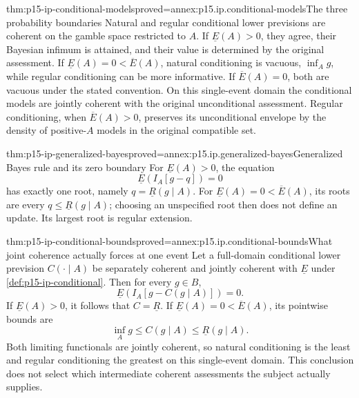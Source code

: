 \begin{hbtheorem}{thm:p15-ip-conditional-models}{proved=annex:p15.ip.conditional-models}{The three probability boundaries}
Natural and regular conditional lower previsions are coherent on the
gamble space restricted to \(A\). If \(\underline E(A)>0\), they agree,
their Bayesian infimum is attained, and their value is determined by the
original assessment. If \(\underline E(A)=0<\overline E(A)\), natural
conditioning is vacuous, \(\inf_A g\), while regular conditioning can
be more informative. If \(\overline E(A)=0\), both are vacuous under
the stated convention. On this single-event domain the conditional models
are jointly coherent with the original unconditional assessment. Regular
conditioning, when \(\overline E(A)>0\), preserves its unconditional
envelope by the density of
positive-\(A\) models in the original compatible set.
\end{hbtheorem}

\begin{hbtheorem}{thm:p15-ip-generalized-bayes}{proved=annex:p15.ip.generalized-bayes}{Generalized Bayes rule and its zero boundary}
For \(\underline E(A)>0\), the equation
\[
                       \underline E(I_A[g-q])=0
\]
has exactly one root, namely \(q=\underline R(g\mid A)\).
For \(\underline E(A)=0<\overline E(A)\), its roots are every
\(q\leq\underline R(g\mid A)\); choosing an unspecified root then
does not define an update. Its largest root is regular extension.
\end{hbtheorem}

\begin{hbtheorem}{thm:p15-ip-conditional-bounds}{proved=annex:p15.ip.conditional-bounds}{What joint coherence actually forces at one event}
Let a full-domain conditional lower prevision \(C(\cdot\mid A)\)
be separately coherent and jointly coherent with \(\underline E\)
under \cref{def:p15-ip-conditional}. Then for every \(g\in B\),
\[
              \underline E(I_A[g-C(g\mid A)])=0.
\]
If \(\underline E(A)>0\), it follows that \(C=\underline R\).
If \(\underline E(A)=0<\overline E(A)\), its pointwise bounds are
\[
                    \inf_A g\leq C(g\mid A)\leq\underline R(g\mid A).
\]
Both limiting functionals are jointly coherent, so natural conditioning
is the least and regular conditioning the greatest on this single-event
domain. This conclusion does not select which intermediate coherent
assessments the subject actually supplies.
\end{hbtheorem}

